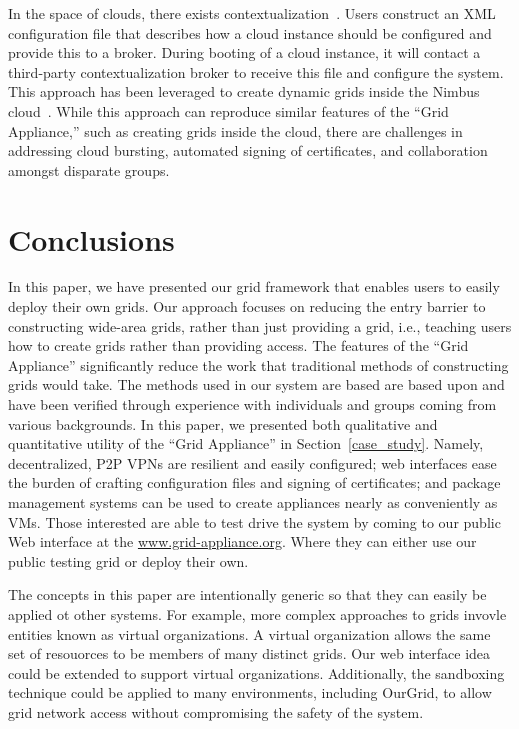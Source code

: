\documentclass[conference]{IEEEtran}
\begin{document}
In the space of clouds, there exists contextualization~\cite{context}.  Users
construct an XML configuration file that describes how a cloud instance should
be configured and provide this to a broker.  During booting of a cloud
instance, it will contact a third-party contextualization broker to receive
this file and configure the system.  This approach has been leveraged to create
dynamic grids inside the Nimbus cloud~\cite{alien_grid}.  While this approach
can reproduce similar features of the ``Grid Appliance,'' such as creating
grids inside the cloud, there are challenges in addressing cloud bursting,
automated signing of certificates, and collaboration amongst disparate groups.

\section{Conclusions}
\label{conclusions}

In this paper, we have presented our grid framework that enables users to
easily deploy their own grids.  Our approach focuses on reducing the entry
barrier to constructing wide-area grids, rather than just providing a grid,
i.e., teaching users how to create grids rather than providing access.  The
features of the ``Grid Appliance'' significantly reduce the work that
traditional methods of constructing grids would take.  The methods used in our
system are based are based upon and have been verified through experience with
individuals and groups coming from various backgrounds.  In this paper, we
presented both qualitative and quantitative utility of the ``Grid Appliance''
in Section~\ref{case_study}.  Namely, decentralized, P2P VPNs are resilient and
easily configured; web interfaces ease the burden of crafting configuration
files and signing of certificates; and package management systems can be used
to create appliances nearly as conveniently as VMs.  Those interested are able
to test drive the system by coming to our public Web interface at the
\url{www.grid-appliance.org}.  Where they can either use our public testing
grid or deploy their own.

The concepts in this paper are intentionally generic so that they can easily be
applied ot other systems.  For example, more complex approaches to grids
invovle entities known as virtual organizations.  A virtual organization allows
the same set of resouorces to be members of many distinct grids.  Our web
interface idea could be extended to support virtual organizations.
Additionally, the sandboxing technique could be applied to many environments,
including OurGrid, to allow grid network access without compromising the safety
of the system.
\end{document}
